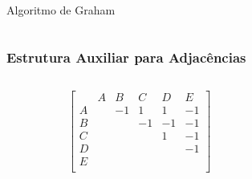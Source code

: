 \documentclass[aspectratio=169,usenames,dvipsnames]{beamer}
\begin{document}
\begin{frame}{Algoritmo de Graham}
  \begin{columns}
    \begin{column}{0.5\textwidth}
      
    \end{column}
    \begin{column}{0.5\textwidth}
        \begin{itemize}
        \end{itemize}
    \end{column}
  \end{columns}
\end{frame}

\begin{frame}
  \frametitle{Estrutura Auxiliar para Adjacências}
  
  \begin{columns}
   \begin{column}{0.5\textwidth}
  \[
  \begin{bmatrix}
      & A & B & C & D & E \\
  A &   & -1 & 1 &  1& -1 \\
  B &   &    & -1  & -1  & -1 \\
  C &   &    &    & 1  & -1 \\
  D &   &    &    &    & -1 \\
  E &   &    &    &    &   \\
  \end{bmatrix}
  \]
   \end{column} 
   \begin{column}{0.5\textwidth}
    
    
   \end{column} 
  \end{columns}
  
  \end{frame}
\end{document}
